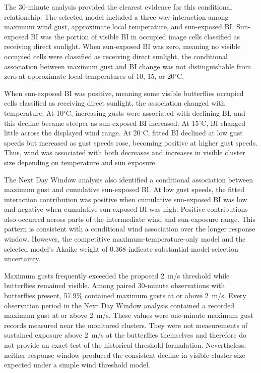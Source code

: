 \documentclass[insects,article,submit,pdftex,moreauthors]{Definitions/mdpi}
\begin{document}
The 30-minute analysis provided the clearest evidence for this conditional relationship. The selected model included a three-way interaction among maximum wind gust, approximate local temperature, and sun-exposed BI. Sun-exposed BI was the portion of visible BI in occupied image cells classified as receiving direct sunlight. When sun-exposed BI was zero, meaning no visible occupied cells were classified as receiving direct sunlight, the conditional association between maximum gust and BI change was not distinguishable from zero at approximate local temperatures of 10, 15, or 20$^{\circ}$C.

When sun-exposed BI was positive, meaning some visible butterflies occupied cells classified as receiving direct sunlight, the association changed with temperature. At 10$^{\circ}$C, increasing gusts were associated with declining BI, and this decline became steeper as sun-exposed BI increased. At 15$^{\circ}$C, BI changed little across the displayed wind range. At 20$^{\circ}$C, fitted BI declined at low gust speeds but increased as gust speeds rose, becoming positive at higher gust speeds. Thus, wind was associated with both decreases and increases in visible cluster size depending on temperature and sun exposure.

The Next Day Window analysis also identified a conditional association between maximum gust and cumulative sun-exposed BI. At low gust speeds, the fitted interaction contribution was positive when cumulative sun-exposed BI was low and negative when cumulative sun-exposed BI was high. Positive contributions also occurred across parts of the intermediate wind and sun-exposure range. This pattern is consistent with a conditional wind association over the longer response window. However, the competitive maximum-temperature-only model and the selected model's Akaike weight of 0.368 indicate substantial model-selection uncertainty.

Maximum gusts frequently exceeded the proposed 2~m/s threshold while butterflies remained visible. Among paired 30-minute observations with butterflies present, 57.9\% contained maximum gusts at or above 2~m/s. Every observation period in the Next Day Window analysis contained a recorded maximum gust at or above 2~m/s. These values were one-minute maximum gust records measured near the monitored clusters. They were not measurements of sustained exposure above 2~m/s at the butterflies themselves and therefore do not provide an exact test of the historical threshold formulation. Nevertheless, neither response window produced the consistent decline in visible cluster size expected under a simple wind threshold model.
\end{document}

